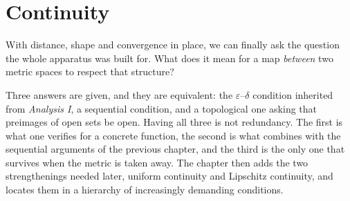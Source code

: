 \chapter{Continuity}
\label{ch:continuity}

With distance, shape and convergence in place, we can finally ask the question the whole
apparatus was built for. What does it mean for a map \emph{between} two metric spaces to respect
that structure?

Three answers are given, and they are equivalent: the $\varepsilon$--$\delta$ condition inherited
from \emph{Analysis I}, a sequential condition, and a topological one asking that preimages of
open sets be open. Having all three is not redundancy. The first is what one verifies for a
concrete function, the second is what combines with the sequential arguments of the previous
chapter, and the third is the only one that survives when the metric is taken away. The chapter
then adds the two strengthenings needed later, uniform continuity and Lipschitz continuity, and
locates them in a hierarchy of increasingly demanding conditions.




